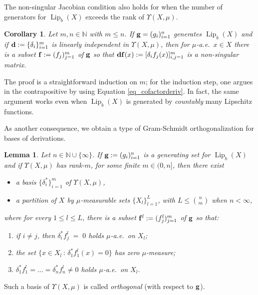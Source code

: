 \documentclass[reqno]{amsart}
\theoremstyle{plain}
\newtheorem{cor}[thm]{Corollary}
\newtheorem{lemma}[thm]{Lemma}
\theoremstyle{definition}
\theoremstyle{remark}
\numberwithin{equation}{section}
\renewcommand{\d}{\delta}
\newcommand{\Lip}{\operatorname{Lip}}
\newcommand{\N}{\mathbb{N}}
\newcommand{\U}{\Upsilon}
\begin{document}
The non-singular Jacobian condition also holds for when the number of generators for $\Lip_b(X)$ exceeds the rank of $\U(X,\mu)$.

\begin{cor} \label{cor_nonsing}
Let $m,n \in \N$ with $m \leq n$.  If ${\bf g} = (g_i)_{i=1}^n$ generates $\Lip_b(X)$ and if ${\bf d} := \{\d_i\}_{i=1}^m$ is linearly independent in $\U(X,\mu)$, then for $\mu$-a.e.\ $x \in X$ there is a subset ${\bf f} := (f_j)_{j=1}^m$ of ${\bf g}$ so that 
${\bf df}(x) := [\d_if_j(x)]_{i,j=1}^m$
is a non-singular matrix.
\end{cor}

The proof is a straightforward induction on $m$; for the induction step, one argues in the contrapositive by using Equation \eqref{eq_cofactorderiv}.  In fact, the same argument works even when $\Lip_b(X)$ is generated by {\em countably} many Lipschitz functions.

As another consequence, we obtain a type of Gram-Schmidt orthogonalization for bases of derivations.

\begin{lemma}  \label{lemma_ON} 
Let $n \in \N \cup \{\infty\}$.  If ${\bf g} := (g_i)_{i=1}^n$ is a generating set for $\Lip_b(X)$ and if $\U(X,\mu)$ has rank-$m$, for some finite $m \in (0, n]$, then there exist
\begin{itemize}
\item a basis $\{\d_i^*\}_{i=1}^m$ of $\U(X,\mu)$,
\item a partition of $X$ by $\mu$-measurable sets $\{X_l\}_{l=1}^L$, with $L \leq \binom{n}{m}$  when $n < \infty$,
\end{itemize}
where for every $1 \leq l \leq L$, there is a subset ${\bf f}^l := (f^l_j)_{j=1}^m$ of ${\bf g}$ so that:
\begin{enumerate}
\item if $i \neq j$, then $\d_i^*f_j^l \;=\; 0$ holds $\mu$-a.e.\ on $X_l$;
\item the set $\{ x \in X_l \,:\, \d_1^*f_1^l(x) = 0\}$ has zero $\mu$-measure;
\item $\d_1^*f_1^l = \ldots = \d_n^*f_n^l \neq 0$ holds $\mu$-a.e.\ on $X_l$.
\end{enumerate}
\end{lemma}

Such a basis of $\U(X,\mu)$ is called {\em orthogonal} (with respect to ${\bf g}$).
\end{document}
